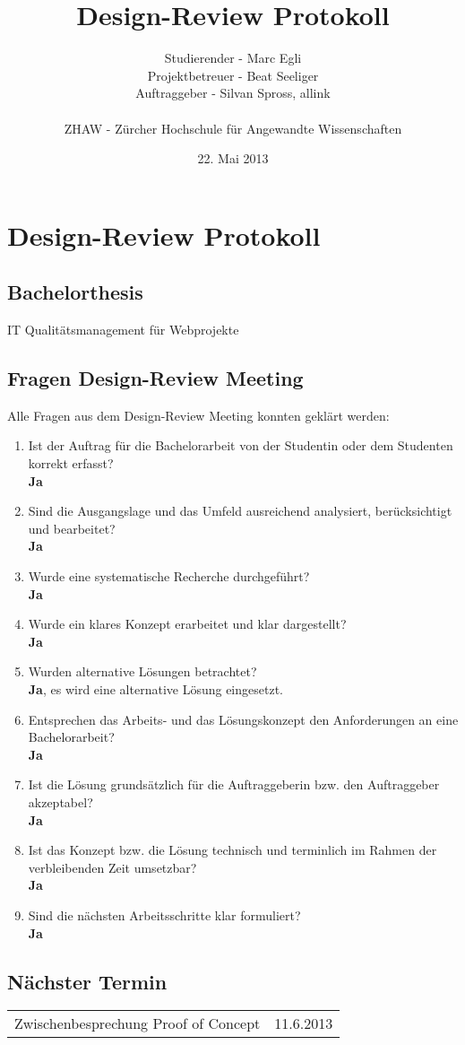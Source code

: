\documentclass[]{scrreprt}
\title{Design-Review Protokoll}
\author{Studierender - Marc Egli\\
    Projektbetreuer - Beat Seeliger\\
    Auftraggeber - Silvan Spross, allink\\
    \\
    ZHAW - Zürcher Hochschule für Angewandte Wissenschaften}
\date{22. Mai 2013}
\begin{document}
    \ifpdf
    \else
    \fi

    \maketitle



    \chapter{Design-Review Protokoll}

    \section{Bachelorthesis}
    IT Qualitätsmanagement für Webprojekte

    \section{Fragen Design-Review Meeting}
    Alle Fragen aus dem Design-Review Meeting konnten geklärt werden:
    \begin{enumerate}
        \item Ist der Auftrag für die Bachelorarbeit von der Studentin oder dem Studenten korrekt erfasst? \\
            {\bf Ja}
        \item Sind die Ausgangslage und das Umfeld ausreichend analysiert, berücksichtigt und bearbeitet? \\
            {\bf Ja}
        \item Wurde eine systematische Recherche durchgeführt? \\
            {\bf Ja}
        \item Wurde ein klares Konzept erarbeitet und klar dargestellt? \\
            {\bf Ja}
        \item Wurden alternative Lösungen betrachtet? \\
            {\bf Ja}, es wird eine alternative Lösung eingesetzt.
        \item Entsprechen das Arbeits- und das Lösungskonzept den Anforderungen an eine Bachelorarbeit? \\
            {\bf Ja}
        \item Ist die Lösung grundsätzlich für die Auftraggeberin bzw. den Auftraggeber akzeptabel? \\
            {\bf Ja}
        \item Ist das Konzept bzw. die Lösung technisch und terminlich im Rahmen der verbleibenden Zeit umsetzbar? \\
            {\bf Ja}
        \item Sind die nächsten Arbeitsschritte klar formuliert? \\
            {\bf Ja}
    \end{enumerate}
        
    \section{Nächster Termin}
    \begin{tabular}{l r}
        Zwischenbesprechung Proof of Concept & 11.6.2013 \\
    \end{tabular}
    
\end{document}
